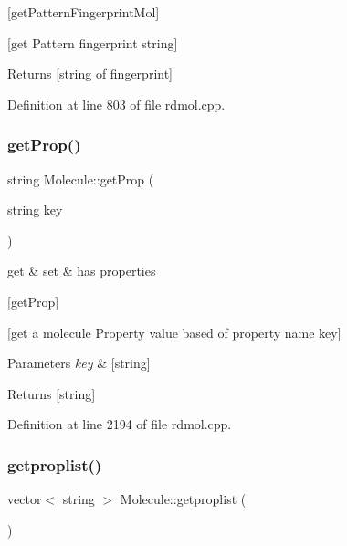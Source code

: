 \mbox{[}get\+Pattern\+Fingerprint\+Mol\mbox{]} 

\mbox{[}get Pattern fingerprint string\mbox{]}

\begin{DoxyReturn}{Returns}
\mbox{[}string of fingerprint\mbox{]} 
\end{DoxyReturn}


Definition at line 803 of file rdmol.\+cpp.

\mbox{\label{class_molecule_ad465fbdb8c43e8280e4dcf3eefac1e13}} 
\subsubsection{\texorpdfstring{get\+Prop()}{getProp()}}
{\footnotesize\ttfamily string Molecule\+::get\+Prop (\begin{DoxyParamCaption}\item[{string}]{key }\end{DoxyParamCaption})}



get \& set \& has properties 

\mbox{[}get\+Prop\mbox{]}

\mbox{[}get a molecule Property value based of property name key\mbox{]}


\begin{DoxyParams}{Parameters}
{\em key} & \mbox{[}string\mbox{]} \\
\hline
\end{DoxyParams}
\begin{DoxyReturn}{Returns}
\mbox{[}string\mbox{]} 
\end{DoxyReturn}


Definition at line 2194 of file rdmol.\+cpp.

\mbox{\label{class_molecule_a5296c86bec78924d64bc2a9472eb91d5}} 
\subsubsection{\texorpdfstring{getproplist()}{getproplist()}}
{\footnotesize\ttfamily vector$<$ string $>$ Molecule\+::getproplist (\begin{DoxyParamCaption}{ }\end{DoxyParamCaption})}



